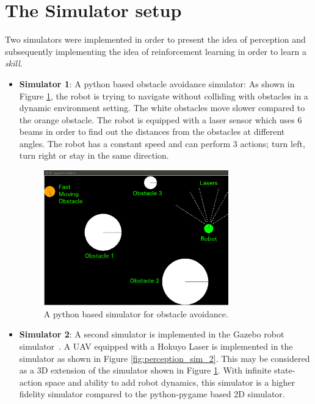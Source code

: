 \documentclass[12pt]{report}
\begin{document}
\section{The Simulator setup}
\label{sims}
Two simulators were implemented in order to present the idea of perception and subsequently implementing the idea of reinforcement learning in order to learn a \textit{skill}.
\begin{itemize}
\item \textbf{Simulator 1}: A python based obstacle avoidance simulator: As shown in Figure \ref{fig:perception_sim_1}, the robot is trying to navigate without colliding with obstacles in a dynamic environment setting. The white obstacles move slower compared to the orange obstacle. The robot is equipped with a laser sensor which uses $6$ beams in order to find out the distances from the obstacles at different angles. The robot has a constant speed and can perform $3$ actions; turn left, turn right or stay in the same direction. 

\begin{figure}[htp]
	\centering
	\includegraphics[width=8cm]{perception_sim_1.png}
	\caption {A python based simulator for obstacle avoidance.}
   \label{fig:perception_sim_1}
\end{figure}

\item \textbf{Simulator 2}: A second simulator is implemented in the Gazebo robot simulator~\cite{koenig2004design}. A UAV equipped with a Hokuyo Laser is implemented in the simulator as shown in Figure \ref{fig:perception_sim_2}. This may be considered as a $3$D extension of the simulator shown in Figure \ref{fig:perception_sim_1}. With infinite state-action space and ability to add robot dynamics, this simulator is a higher fidelity simulator compared to the python-pygame based $2$D simulator. 


\end{itemize}
\end{document}
